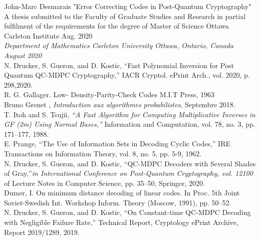\documentclass[12pt,openany]{report}
\begin{document}
\begin{thebibliography}{1}
 John-Marc Desmarais 
"Error Correcting Codes in Post-Quantum Cryptography"  A thesis submitted to the Faculty of Graduate Studies and Research in partial fulfilment of the requirements for the degree of Master of Science Ottawa Carleton Institute Aug. 2020\\

{\it Department of Mathematics
Carleton University
Ottawa, Ontario, Canada
August 2020} \\

 N. Drucker, S. Gueron, and D. Kostic, “Fast Polynomial Inversion for Post Quantum QC-MDPC Cryptography,” IACR Cryptol. ePrint Arch., vol. 2020, p. 298,2020.\\

  R. G. Gallager. Low- Density-Parity-Check Codes M.I.T Press, 1963 \\

 Bruno Grenet , {\em Introduction aux algorithmes probabilistes}, Septembre 2018. \\


 T. Itoh and S. Tsujii, \textit{“A Fast Algorithm for Computing Multiplicative Inverses
in GF (2m) Using Normal Bases,”}  Information and Computation, vol. 78, no. 3,
pp. 171–177, 1988.\\



  E. Prange, “The Use of Information Sets in Decoding Cyclic Codes,” IRE Transactions on Information Theory, vol. 8, no. 5, pp. 5-9, 1962.\\



 

 N. Drucker, S. Gueron, and D. Kostic, “QC-MDPC Decoders with Several Shades
of Gray,”\textit{in International Conference on Post-Quantum Cryptography, vol. 12100} of Lecture Notes in Computer Science, pp. 35–50, Springer, 2020.\\


 Dumer, I. On minimum distance decoding of linear codes. In Proc. 5th Joint Soviet-Swedish Int.
Workshop Inform. Theory (Moscow, 1991), pp. 50–52.\\



 N. Drucker, S. Gueron, and D. Kostic, “On Constant-time QC-MDPC Decoding with Negligible Failure Rate,” Technical Report, Cryptology ePrint Archive,
Report 2019/1289, 2019.\\


\end{thebibliography}
\end{document}
